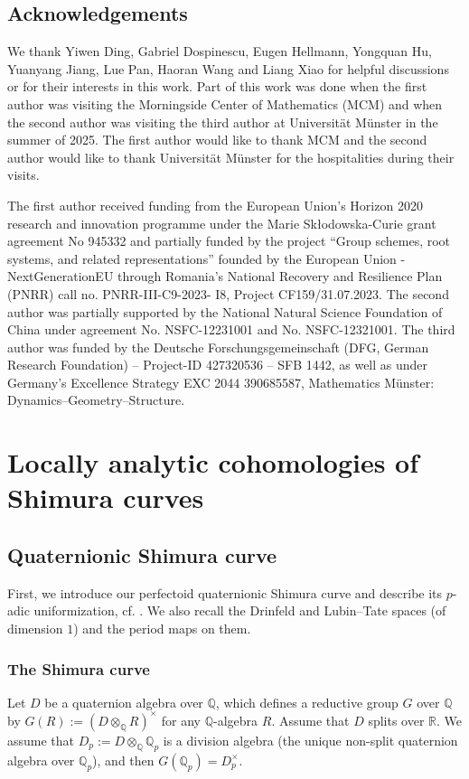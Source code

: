 \documentclass{article}
\theoremstyle{definition}
\def\bbQ{\mathbb{Q}}
\def\bbR{\mathbb{R}}
\DeclareMathOperator{\ox}{\otimes}
\begin{document}
\subsection*{Acknowledgements}
We thank Yiwen Ding, Gabriel Dospinescu, Eugen Hellmann, Yongquan Hu, Yuanyang Jiang, Lue Pan, Haoran Wang and Liang Xiao for helpful discussions or for their interests in this work. Part of this work was done when the first author was visiting the Morningside Center of Mathematics (MCM) and when the second author was visiting the third author at Universität Münster in the summer of 2025. The first author would like to thank MCM and the second author would like to thank Universität Münster for the hospitalities during their visits.

The first author received funding from the European Union's Horizon 2020 research and innovation programme under the Marie Skłodowska-Curie grant agreement No 945332 and partially funded by the project “Group schemes, root systems, and related representations” founded by the European Union - NextGenerationEU through Romania’s National Recovery and Resilience Plan (PNRR) call no. PNRR-III-C9-2023- I8, Project CF159/31.07.2023. The second author was partially supported by the National Natural Science Foundation of China under agreement No. NSFC-12231001 and No. NSFC-12321001. The third author was funded by the Deutsche Forschungsgemeinschaft (DFG, German Research Foundation) – Project-ID 427320536 – SFB 1442, as well as under Germany's Excellence Strategy EXC 2044 390685587, Mathematics Münster: Dynamics–Geometry–Structure.

\section{Locally analytic cohomologies of Shimura curves}
\subsection{Quaternionic Shimura curve}\label{sec:quaternionicshimuracurve} First, we introduce our perfectoid quaternionic Shimura curve and describe its $p$-adic uniformization, cf. \cite[\S 5, \S 6]{Scholze2018LubinTate}. We also recall the Drinfeld and Lubin--Tate spaces (of dimension $1$) and the period maps on them.
\subsubsection{The Shimura curve}\label{subsec:quaternionicshimuracurve}
Let $D$ be a quaternion algebra over $\bbQ$, which defines a reductive group $G$ over $\bbQ$ by $G(R):=(D\ox_{\bbQ}R)^\times$ for any $\bbQ$-algebra $R$. Assume that $D$ splits over $\bbR$. We assume that $D_p:=D\ox_{\bbQ} \bbQ_p$ is a division algebra (the unique non-split quaternion algebra over $\bbQ_p$), and then $G(\bbQ_p)=D_p^{\times}$. 
\end{document}
